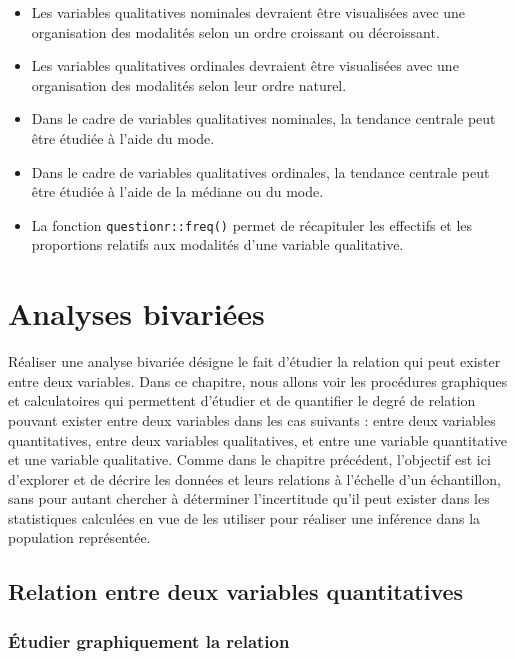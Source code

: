 \documentclass[
]{book}
\begin{document}
\begin{itemize}
\item
  Les variables qualitatives nominales devraient être visualisées avec une organisation des modalités selon un ordre croissant ou décroissant.
\item
  Les variables qualitatives ordinales devraient être visualisées avec une organisation des modalités selon leur ordre naturel.
\item
  Dans le cadre de variables qualitatives nominales, la tendance centrale peut être étudiée à l'aide du mode.
\item
  Dans le cadre de variables qualitatives ordinales, la tendance centrale peut être étudiée à l'aide de la médiane ou du mode.
\item
  La fonction \texttt{questionr::freq()} permet de récapituler les effectifs et les proportions relatifs aux modalités d'une variable qualitative.
\end{itemize}

\hypertarget{analyses-bivariuxe9es}{%
\chapter{Analyses bivariées}\label{analyses-bivariuxe9es}}

Réaliser une analyse bivariée désigne le fait d'étudier la relation qui peut exister entre deux variables. Dans ce chapitre, nous allons voir les procédures graphiques et calculatoires qui permettent d'étudier et de quantifier le degré de relation pouvant exister entre deux variables dans les cas suivants : entre deux variables quantitatives, entre deux variables qualitatives, et entre une variable quantitative et une variable qualitative. Comme dans le chapitre précédent, l'objectif est ici d'explorer et de décrire les données et leurs relations à l'échelle d'un échantillon, sans pour autant chercher à déterminer l'incertitude qu'il peut exister dans les statistiques calculées en vue de les utiliser pour réaliser une inférence dans la population représentée.

\hypertarget{relation-entre-deux-variables-quantitatives}{%
\section{Relation entre deux variables quantitatives}\label{relation-entre-deux-variables-quantitatives}}

\hypertarget{uxe9tudier-graphiquement-la-relation}{%
\subsection{Étudier graphiquement la relation}\label{uxe9tudier-graphiquement-la-relation}}
\end{document}
